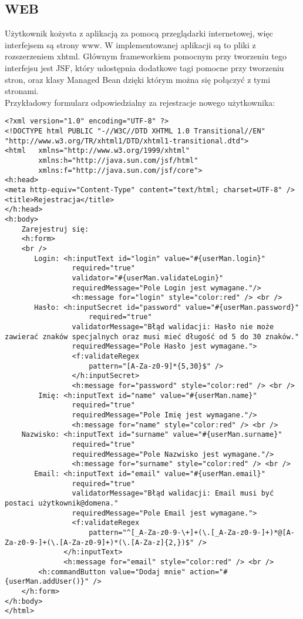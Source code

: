 \subsection{WEB}
Użytkownik kożysta z aplikacją za pomocą przeglądarki internetowej, więc interfejsem są strony www. W implementowanej aplikacji są to pliki z rozszerzeniem xhtml. Głównym frameworkiem pomocnym przy tworzeniu tego interfejsu jest JSF, który udostępnia dodatkowe tagi pomocne przy tworzeniu stron, oraz klasy Managed Bean dzięki którym można się połączyć z tymi stronami.\\
Przykładowy formularz odpowiedzialny za rejestracje nowego użytkownika:
\begin{lstlisting}[breaklines=true]
<?xml version="1.0" encoding="UTF-8" ?>
<!DOCTYPE html PUBLIC "-//W3C//DTD XHTML 1.0 Transitional//EN" "http://www.w3.org/TR/xhtml1/DTD/xhtml1-transitional.dtd">
<html 	xmlns="http://www.w3.org/1999/xhtml" 
		xmlns:h="http://java.sun.com/jsf/html"
		xmlns:f="http://java.sun.com/jsf/core"> 
<h:head>
<meta http-equiv="Content-Type" content="text/html; charset=UTF-8" />
<title>Rejestracja</title>
</h:head> 
<h:body>  
	Zarejestruj się: 
	<h:form>
	<br />
	   Login: <h:inputText id="login" value="#{userMan.login}" 
	   			required="true"
	   			validator="#{userMan.validateLogin}"
	   			requiredMessage="Pole Login jest wymagane."/> 
	   			<h:message for="login" style="color:red" /> <br />
	   Hasło: <h:inputSecret id="password" value="#{userMan.password}" 
					required="true" 
	   			validatorMessage="Błąd walidacji: Hasło nie może zawierać znaków specjalnych oraz musi mieć długość od 5 do 30 znaków."
	   			requiredMessage="Pole Hasło jest wymagane.">  
	   			<f:validateRegex
					pattern="[A-Za-z0-9]*{5,30}$" />
			    </h:inputSecret>
			    <h:message for="password" style="color:red" /> <br />
		Imię: <h:inputText id="name" value="#{userMan.name}" 
				required="true"  
				requiredMessage="Pole Imię jest wymagane."/> 
				<h:message for="name" style="color:red" /> <br />
	Nazwisko: <h:inputText id="surname" value="#{userMan.surname}" 
				required="true" 
				requiredMessage="Pole Nazwisko jest wymagane."/> 
				<h:message for="surname" style="color:red" /> <br />
	   Email: <h:inputText id="email" value="#{userMan.email}" 
				required="true" 
				validatorMessage="Błąd walidacji: Email musi być postaci użytkownik@domena."
				requiredMessage="Pole Email jest wymagane."> 
				<f:validateRegex
					pattern="^[_A-Za-z0-9-\+]+(\.[_A-Za-z0-9-]+)*@[A-Za-z0-9-]+(\.[A-Za-z0-9]+)*(\.[A-Za-z]{2,})$" />
			  </h:inputText>
			  <h:message for="email" style="color:red" /> <br />
		<h:commandButton value="Dodaj mnie" action="#{userMan.addUser()}" />
	</h:form>
</h:body>
</html>
\end{lstlisting}
